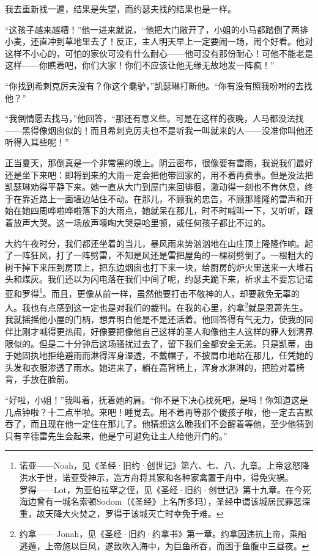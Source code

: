 \par 我去重新找一遍，结果是失望，而约瑟夫找的结果也是一样。
\par “这孩子越来越糟！”他一进来就说，“他把大门敞开了，小姐的小马都踏倒了两排小麦，还直冲到草地里去了！反正，主人明天早上一定要闹一场，闹个好看。他对这样不小心的，可怕的家伙可没有什么耐心——他可没有那份耐心！可他不能老是这样——你瞧着吧，你们大家！你们不应该让他无缘无故地发一阵疯！”
\par “你找到希刺克厉夫没有？你这个蠢驴，”凯瑟琳打断他。“你有没有照我吩咐的去找他？”
\par “我倒情愿去找马，”他回答，“那还有意义些。可是在这样的夜晚，人马都没法找——黑得像烟囱似的！而且希刺克厉夫也不是听我一叫就来的人——没准你叫他还听得入耳些呢！”
\par 正当夏天，那倒真是一个非常黑的晚上。阴云密布，很像要有雷雨，我说我们最好还是坐下来吧：即将到来的大雨一定会把他带回家的，用不着再费事。但是没法把凯瑟琳劝得平静下来。她一直从大门到屋门来回徘徊，激动得一刻也不肯休息，终于在靠近路上一面墙边站住不动。在那儿，不顾我的忠告，不顾那隆隆的雷声和开始在她四周哗啦哗啦落下的大雨点，她就呆在那儿，时不时喊叫一下，又听听，跟着放声大哭。这一场放声嚎啕大哭是哈里顿，或任何孩子都比不过的。
\par 大约午夜时分，我们都还坐着的当儿，暴风雨来势汹汹地在山庄顶上隆隆作响。起了一阵狂风，打了一阵劈雷，不知是风还是雷把屋角的一棵树劈倒了。一根粗大的树干掉下来压到房顶上，把东边烟囱也打下来一块，给厨房的炉火里送来一大堆石头和煤灰。我们还以为闪电落在我们中间了呢，约瑟夫跪下来，祈求主不要忘记诺亚和罗得\footnote{诺亚——Noah，见《圣经·旧约·创世记》第六、七、八、九章。上帝忿怒降洪水于世，诺亚受神示，造方舟将其家和各种家禽置于舟中，得免灾祸。\\罗得——Lot，为亚伯拉罕之侄，见《圣经·旧约·创世记》第十九章。在今死海边曾有一城名索顿Sodom（《圣经》上名所多玛），圣经中谓该城居民罪恶深重，故天降大火焚之，罗得于该城灭亡时幸免于难。}。而且，更像从前一样，虽然他要打击不敬神的人，却要赦免无辜的人。我也有点感到这一定也是对我们的裁判。在我的心里，约拿\footnote{约拿—— Jonah，见《圣经·旧约·约拿书》第一章。约拿因违抗上帝，乘船逃遁，上帝施以巨风，遂致吹入海中，为巨鱼所吞，而困于鱼腹中三昼夜。}就是恩萧先生。我就摇摇他小屋的门柄，想弄明白他是不是还活着。他回答得有气无力，使我的同伴比刚才喊得更热闹，好像要把像他自己这样的圣人和像他主人这样的罪人划清界限似的。但是二十分钟后这场骚扰过去了，留下我们全都安全无恙。只是凯蒂，由于她固执地拒绝避雨而淋得浑身湿透，不戴帽子，不披肩巾地站在那儿，任凭她的头发和衣服渗透了雨水。她进来了，躺在高背椅上，浑身水淋淋的，把脸对着椅背，手放在脸前。
\par “好啦，小姐！”我叫着，抚着她的肩。“你不是下决心找死吧，是吗！你知道这是几点钟啦？十二点半啦。来吧！睡觉去。用不着再等那个傻孩子啦，他一定去吉默吞了，而且现在他一定住在那儿了。他猜想这么晚我们不会醒着等他，至少他猜到只有辛德雷先生会起来，他是宁可避免让主人给他开门的。”


